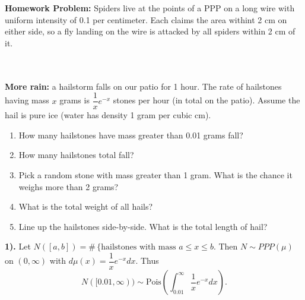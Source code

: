 \documentclass{article}
\author{Nathan}  %
\date{October 12 and 15}    %
\begin{document}
%

\makelecture

\textbf{Homework Problem:} Spiders live at the points of a PPP on a long wire with uniform intensity of 0.1 per centimeter. Each claims the area withint 2 cm on either side, so a fly landing on the wire is attacked by all spiders within 2 cm of it.


\hrulefill\\\\

\textbf{More rain:} a hailstorm falls on our patio for 1 hour. The rate of hailstones having mass $x$ grams is $e^{-x}$ stones per hour (in total on the patio). Assume the hail is pure ice (water has density 1 gram per cubic cm).

\begin{enumerate}
\item How many hailstones have mass greater than 0.01 grams fall?

\item How many hailstones total fall?

\item Pick a random stone with mass greater than 1 gram. What is the chance it weighs more than 2 grams?

\item What is the total weight of all hails?

\item Line up the hailstones side-by-side. What is the total length of hail?
\end{enumerate}

\textbf{1).} 
Let $N([a,b])=\#\,\{\textrm{hailstones with mass $a\leq x\leq b$}$. 
Then $N\sim PPP(\mu)$ on $(0,\infty)$ with $d\mu(x)=e^{-x}dx$. 
Thus
$$N([0.01,\infty))\sim\textrm{Pois}\left( \int_{0.01}^\infty \frac{1}{x}e^{-x}dx\right).$$
\end{document}
